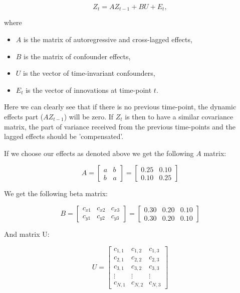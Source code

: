 \documentclass{article}
\begin{document}
\[
Z_t = A Z_{t-1} + B U + E_t,
\]

\noindent
where

\begin{itemize}
    \item $A$ is the matrix of autoregressive and cross-lagged effects,
    \item $B$ is the matrix of confounder effects,
    \item $U$ is the vector of time-invariant confounders,
    \item $E_t$ is the vector of innovations at time-point $t$.
\end{itemize}

\noindent
Here we can clearly see that if there is no previous time-point, the dynamic effects part ($A Z_{t-1}$) will be zero. If $Z_t$ is then to have
a similar covariance matrix, the part of variance received from the previous time-points and the lagged effects should be 'compensated'. 

\noindent
If we choose our effects as denoted above we get the following $A$ matrix:

\[
A = \begin{bmatrix} a & b \\ b & a \end{bmatrix}
= \begin{bmatrix} 0.25 & 0.10 \\ 0.10 & 0.25 \end{bmatrix}
\]

\noindent
We get the following beta matrix:

\[
B = \begin{bmatrix} c_{x1} & c_{x2} & c_{x3} \\ c_{y1} & c_{y2} & c_{y3} \end{bmatrix}
= \begin{bmatrix} 0.30 & 0.20 & 0.10 \\ 0.30 & 0.20 & 0.10 \end{bmatrix}
\]

\noindent
And matrix U:

\[
U =
\begin{bmatrix}
c_{1,1} & c_{1,2} & c_{1,3} \\
c_{2,1} & c_{2,2} & c_{2,3} \\
c_{3,1} & c_{3,2} & c_{3,3} \\
\vdots  & \vdots  & \vdots  \\
c_{N,1} & c_{N,2} & c_{N,3}
\end{bmatrix}
\]
\end{document}
